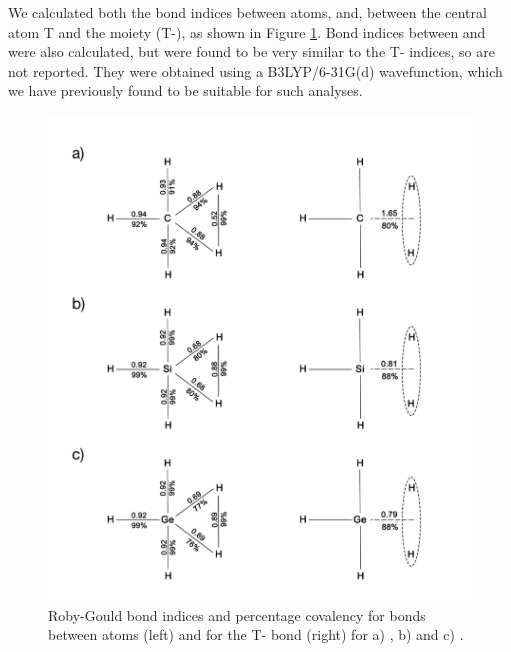 \documentclass[journal=jpcafh,manuscript=letter]{achemso}
\begin{document}
We calculated both the bond indices between atoms,
and, between the central atom T and the  moiety
(T-), as shown in Figure \ref{fig}. Bond indices between 
and  were also calculated, but were found to be very
similar to the T- indices, so are not reported.
They were obtained using a B3LYP/6-31G(d) wavefunction,
which we have previously found to be suitable for such 
analyses\cite{Gould2008,Alhameedi2018:IJQC,Alhameedi2018}. 


\begin{figure}
\includegraphics[width=14cm]{TH5allimages.jpg}
\caption{Roby-Gould bond indices and percentage covalency
for bonds between atoms (left) and for the T- bond (right)
for a) , b)  and c) .}
\label{fig}
\end{figure}
\end{document}
